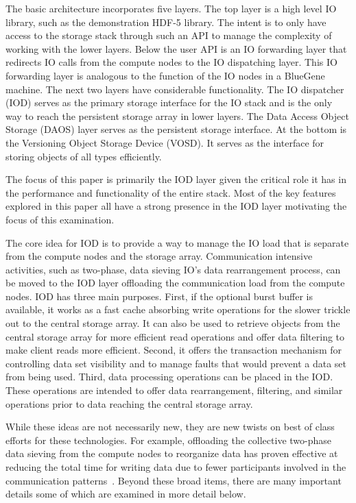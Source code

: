 \documentclass[conference]{IEEEtran}
\begin{document}
The basic architecture incorporates five layers. The top layer is a high level
IO library, such as the demonstration HDF-5 library. The intent is to only have
access to the storage stack through such an API to manage the complexity of
working with the lower layers. Below the user API is an IO forwarding layer
that redirects IO calls from the compute nodes to the IO dispatching layer.
This IO forwarding layer is analogous to the function of the IO nodes in a
BlueGene machine. The next two layers have considerable functionality. The IO
dispatcher (IOD) serves as the primary storage interface for the IO stack and
is the only way to reach the persistent storage array in lower layers. The
Data Access Object Storage (DAOS) layer serves as the persistent storage
interface. At the bottom is the Versioning Object Storage Device (VOSD). It
serves as the interface for storing objects of all types efficiently.

The focus of this paper is primarily the IOD layer given the critical role it
has in the performance and functionality of the entire stack. Most of the key
features explored in this paper all have a strong presence in the IOD layer
motivating the focus of this examination.

The core idea for IOD is to provide a way to manage the IO load that is
separate from the compute nodes and the storage array. Communication intensive
activities, such as two-phase, data sieving IO's data rearrangement process,
can be moved to the IOD layer offloading the communication load from the
compute nodes. IOD has three main purposes. First, if the optional burst buffer
is available, it works as a fast cache absorbing write operations for the
slower trickle out to the central storage array. It can also be used to
retrieve objects from the central storage array for more efficient read
operations and offer data filtering to make client reads more efficient.
Second, it offers the transaction mechanism for controlling data set visibility
and to manage faults that would prevent a data set from being used. Third, data
processing operations can be placed in the IOD. These operations are intended
to offer data rearrangement, filtering, and similar operations prior to data
reaching the central storage array.

While these ideas are not necessarily new, they are new twists on best of class
efforts for these technologies. For example, offloading the collective
two-phase data sieving from the compute nodes to reorganize data has proven
effective at reducing the total time for writing data due to fewer participants
involved in the communication patterns~\cite{lofstead:2011:nessie-staging}.
Beyond these broad items, there are many important details some of which are
examined in more detail below.
\end{document}
